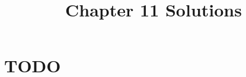 \documentclass[12pt]{article}
\title{Chapter 11 Solutions}
\begin{document}
\section{TODO}
\end{document}

